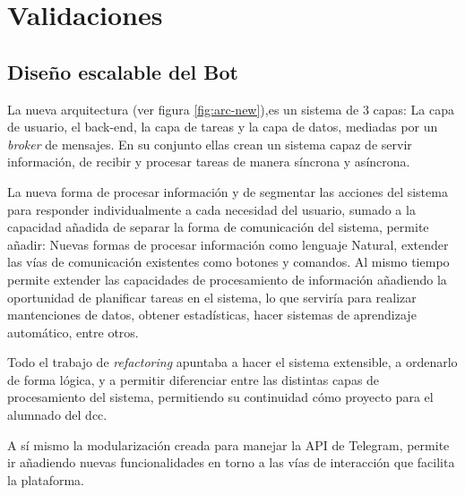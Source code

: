 \chapter{Validaciones}

\section{Diseño escalable del Bot}
    \par La nueva arquitectura (ver figura \ref{fig:arc-new}),es un sistema de 3 capas: La capa de usuario, el back-end, la capa de tareas y la capa de datos, mediadas por un \textit{broker} de mensajes. En su conjunto ellas crean un sistema capaz de servir información, de recibir y procesar tareas de manera síncrona y asíncrona. 
    \par La nueva forma de procesar información y de segmentar  las acciones del sistema para responder individualmente a cada necesidad del usuario, sumado a la capacidad añadida de separar la forma de comunicación del sistema, permite añadir: Nuevas formas de procesar información como lenguaje Natural, extender las vías de comunicación existentes como botones y comandos. Al mismo tiempo permite extender las capacidades de procesamiento de información añadiendo la oportunidad de planificar tareas en el sistema, lo que serviría para realizar mantenciones de datos, obtener estadísticas, hacer sistemas de aprendizaje automático, entre otros.
    \par Todo el trabajo de \textit{refactoring} apuntaba a hacer el sistema extensible, a ordenarlo de forma lógica, y a permitir diferenciar entre las distintas capas de procesamiento del sistema, permitiendo su continuidad cómo proyecto para el alumnado del dcc.
    \par A sí mismo la modularización creada para manejar la API de \gls{Telegram}, permite ir añadiendo nuevas funcionalidades en torno a las vías de interacción que facilita la plataforma.

